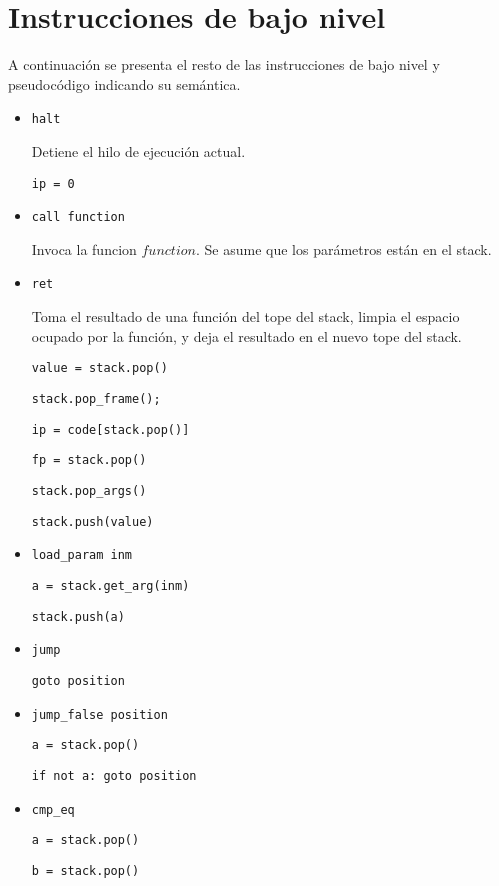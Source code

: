 
\section{Instrucciones de bajo nivel}

  A continuación se presenta el resto de las instrucciones
de bajo nivel y pseudocódigo indicando su semántica.

\begin{itemize}

\item \texttt{halt}

  Detiene el hilo de ejecución actual.

  \texttt{ip = 0} 

\item \texttt{call function}

  Invoca la funcion $function$.
  Se asume que los parámetros están en el stack.

\item \texttt{ret}

  Toma el resultado de una función del tope del stack,
  limpia el espacio ocupado por la función,
  y deja el resultado en el nuevo tope del stack.

  \texttt{value = stack.pop()}

  \texttt{stack.pop\_frame();}

  \texttt{ip = code[stack.pop()]}

  \texttt{fp = stack.pop()}

  \texttt{stack.pop\_args()}

  \texttt{stack.push(value)}

\item \texttt{load\_param inm}

  \texttt{a = stack.get\_arg(inm)}

  \texttt{stack.push(a)}

\item \texttt{jump}

  \texttt{goto position}

\item \texttt{jump\_false position}

  \texttt{a = stack.pop()}

  \texttt{if not a: goto position}

\item \texttt{cmp\_eq}

  \texttt{a = stack.pop()}

  \texttt{b = stack.pop()}


\end{itemize}
